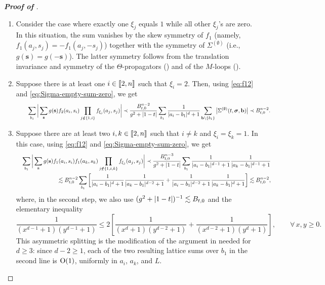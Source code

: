 \begin{proof}[\bf Proof of ]
\begin{enumerate}
    \item Consider the case where exactly one $\xi_j$ equals $1$ while all other $\xi_j$'s are zero. In this situation, the sum vanishes by the skew symmetry of $f_1$ (namely, $f_1(a_j, s_j) = -f_1(a_j, -s_j)$) together with the symmetry of $\Sigma^{(\emptyset)}$ (i.e., $g(\mathbf{s}) = g(-\mathbf{s})$). The latter symmetry follows from the translation invariance and symmetry of the $\Theta$-propagators () and of the $M$-loops ().
    
    \item Suppose there is at least one $i\in\llbracket{2,n}\rrbracket$ such that $\xi_i = 2$. Then, using \eqref{eq:f12} and \eqref{eq:Sigma-empty-sum-zero}, we get 
    \begin{equation*}
     \qquad   \sum_{b_1}\bigg|\sum_{\mathbf{s}} g(\mathbf{s}) f_2(a_i, s_i) \prod_{j\notin \{1,i\}} f_{\xi_j}(a_j, s_j)\bigg| \prec \frac{B_{t, 0 }^{n-2}}{g^2+|1-t|} \sum_{b_1} \frac{1}{|a_i-b_1|^{d}+1} \sum_{\mathbf{b}\setminus \{b_1\}} \big|\Sigma^{(\emptyset)}(t, {\boldsymbol{\sigma}}, \mathbf{b})\big| \prec B_{t, 0 }^{n-2}.
    \end{equation*}

    \item Suppose there are at least two $i,k\in \llbracket{2,n}\rrbracket$ such that $i\neq k$ and $\xi_i=\xi_k = 1$. In this case, using \eqref{eq:f12} and \eqref{eq:Sigma-empty-sum-zero}, we get 
    \begin{align*}
     \quad   \sum_{b_1}\bigg|\sum_{\mathbf{s}} g(\mathbf{s}) f_1(a_i, s_i) f_1(a_k, s_k)\prod_{j\notin \{1,i,k\}} f_{\xi_j}(a_j, s_j)\bigg| \prec \frac{B_{t, 0 }^{n-3}}{g^2+|1-t|} \sum_{b_1} \frac{1}{|a_i-b_1|^{d-1}+1}\frac{1}{|a_k-b_1|^{d-1}+1} \\
        \lesssim  B_{t, 0 }^{n-2}  \sum_{b_1} \left[\frac{1}{|a_i-b_1|^{d}+1}\frac{1}{|a_k-b_1|^{d-2}+1}+\frac{1}{|a_i-b_1|^{d-2}+1}\frac{1}{|a_k-b_1|^{d}+1}\right] \lesssim B_{t, 0 }^{n-2},
    \end{align*}
    where, in the second step, we also use $(g^2+|1-t|)^{-1}\lesssim B_{t,0}$ and the elementary inequality
    \[\frac{1}{(x^{d-1}+1)(y^{d-1}+1)}\le 2\left[\frac{1}{(x^{d}+1)(y^{d-2}+1)}+\frac{1}{(x^{d-2}+1)(y^{d}+1)}\right],\qquad \forall\, x,y\ge 0 .\]
    This asymmetric splitting is the modification of the argument in \cite[Lemma 3.11]{YY_25} needed for $d\ge 3$: since $d-2\ge 1$, each of the two resulting lattice sums over $b_1$ in the second line is $\operatorname{O}(1)$, uniformly in $a_i$, $a_k$, and $L$. 


\end{enumerate}
\end{proof}

